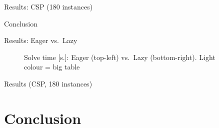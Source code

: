 \documentclass[aspectratio=169]{beamer}
\newcommand{\compare}{base_gurobi-mdd-reduce-dom-incr-nocombined--lazy_gurobi-hybrid_0}
\begin{document}



\begin{frame}{Results: CSP (180 instances)}
\centering
\small
{}

\resultlegend
\end{frame}


\begin{frame}{Conclusion}
\end{frame}

\begin{frame}{Results: Eager vs.\ Lazy}

\centering
\begin{figure}
\centering

	\caption{\small Solve time [s.]: Eager (top-left) vs.\ Lazy (bottom-right). Light colour = big table}
\end{figure}
\end{frame}

\begin{frame}{Results (CSP, 180 instances)}
\centering
\small
\resulttabular{%
\resultencoding{}{}{}
\hline
\resultlazy{}{}{}
\hline
\resulthybrid
}

\resultlegend
\end{frame}

\section{Conclusion}
\end{document}
